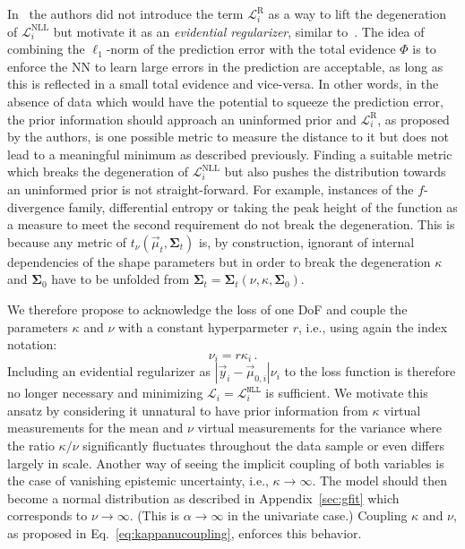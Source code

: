 \documentclass{article}
\begin{document}
In~\cite{amini20} the authors did not introduce the term $\mathcal{L}_i^\text{R}$ as a way to lift the degeneration of $\mathcal{L}_i^\text{NLL}$ but motivate it as an \textit{evidential regularizer}, similar to~\cite{sensoy18}.
The idea of combining the $\ell_1$-norm of the prediction error with the total evidence $\Phi$ is to enforce the NN to learn large errors in the prediction are acceptable, as long as this is reflected in a small total evidence and vice-versa.
In other words, in the absence of data which would have the potential to squeeze the prediction error, the prior information should approach an uninformed prior and $\mathcal{L}_i^\text{R}$, as proposed by the authors, is one possible metric to measure the distance to it but does not lead to a meaningful minimum as described previously.
Finding a suitable metric which breaks the degeneration of $\mathcal{L}_i^\text{NLL}$ but also pushes the distribution towards an uninformed prior is not straight-forward.
For example, instances of the $f$-divergence family, differential entropy or taking the peak height of the function as a measure to meet the second requirement do not break the degeneration.
This is because any metric of $t_\nu(\vec{\mu}_t, \bm{\Sigma}_t)$ is, by construction, ignorant of internal dependencies of the shape parameters but in order to break the degeneration $\kappa$ and $\bm{\Sigma}_0$ have to be unfolded from $\bm{\Sigma}_t = \bm{\Sigma}_t(\nu, \kappa, \bm{\Sigma}_0)$.

We therefore propose to acknowledge the loss of one DoF and couple the parameters $\kappa$ and $\nu$ with a constant hyperparmeter $r$, i.e., using again the index notation:
\begin{equation}
    \label{eq:kappanucoupling}
    \nu_i = r \kappa_i \,.
\end{equation}
Including an evidential regularizer as $|\vec{y}_i - \vec{\mu}_{0,i}| \nu_i$ to the loss function is therefore no longer necessary and minimizing $\mathcal{L}_i = \mathcal{L}_i^\texttt{NLL}$ is sufficient.
We motivate this ansatz by considering it unnatural to have prior information from $\kappa$ virtual measurements for the mean and $\nu$ virtual measurements for the variance where the ratio $\kappa / \nu$ significantly fluctuates throughout the data sample or even differs largely in scale.
Another way of seeing the implicit coupling of both variables is the case of vanishing epistemic uncertainty, i.e., $\kappa \to \infty$.
The model should then become a normal distribution as described in Appendix~\ref{sec:gfit} which corresponds to $\nu \to \infty$.
(This is $\alpha \to \infty$ in the univariate case.)
Coupling $\kappa$ and $\nu$, as proposed in Eq.~\eqref{eq:kappanucoupling}, enforces this behavior.
\end{document}
